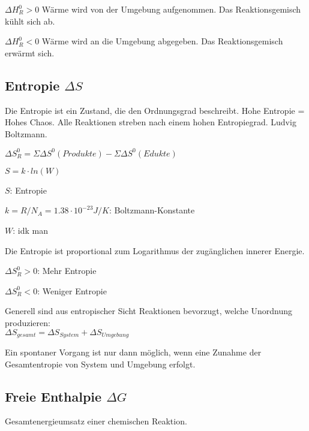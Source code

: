 \begin{definition}
$\Delta H^0_R > 0$
Wärme wird von der Umgebung aufgenommen. Das Reaktionsgemisch kühlt sich ab.
\end{definition}

\begin{definition}
$\Delta H^0_R < 0$
Wärme wird an die Umgebung abgegeben. Das Reaktionsgemisch erwärmt sich.
\end{definition}

\subsection{Entropie $\Delta S$}


	Die Entropie ist ein Zustand, die den Ordnungsgrad beschreibt. Hohe Entropie = Hohes Chaos. Alle Reaktionen streben nach einem hohen Entropiegrad. Ludvig Boltzmann.
	
	\large{
		$\Delta S^0_R = \Sigma \Delta S^0 (Produkte) - \Sigma \Delta S^0 (Edukte)$
	}

\begin{definition}[Entropieformel]
	$S = k \cdot ln(W)$
	
	$S$: Entropie
	
	$k=R/N_A=1.38\cdot 10^{-23} J/K$: Boltzmann-Konstante 
	
	$W$: idk man
	
	Die Entropie ist proportional zum Logarithmus der zugänglichen innerer Energie.
\end{definition}

\begin{definition}[Entropieänderung]
	$\Delta S^0_R > 0$: Mehr Entropie
	
	$\Delta S^0_R < 0$: Weniger Entropie
\end{definition}

Generell sind aus entropischer Sicht Reaktionen bevorzugt, welche Unordnung produzieren: \\
$\Delta S_{gesamt} = \Delta S_{System} + \Delta S_{Umgebung}$

Ein spontaner Vorgang ist nur dann möglich, wenn eine Zunahme der Gesamtentropie von System und Umgebung erfolgt.


\subsection{Freie Enthalpie $\Delta G$}

Gesamtenergieumsatz einer chemischen Reaktion.

